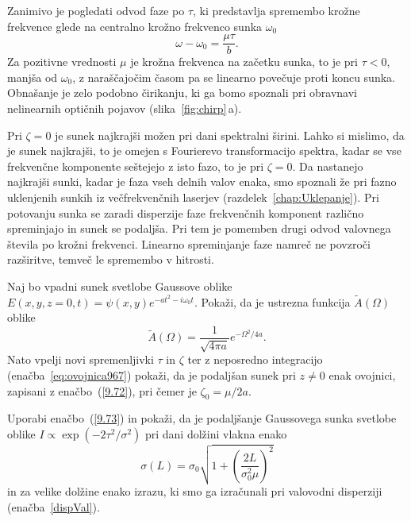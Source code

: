 Zanimivo je pogledati odvod faze po $\tau$, ki predstavlja spremembo krožne
frekvence glede na centralno krožno frekvenco sunka $\omega_{0}$
\begin{equation}
\omega-\omega_{0}=\frac{\mu\tau}{b}.
\label{9.74}
\end{equation}
Za pozitivne vrednosti $\mu$ je krožna frekvenca na začetku sunka,
to je pri $\tau<0$, manjša od $\omega_0$, z naraščajočim časom pa se 
linearno povečuje proti koncu sunka. Obnašanje je zelo podobno čirikanju, 
ki ga bomo spoznali pri obravnavi nelinearnih optičnih pojavov (slika~\ref{fig:chirp}\,a). 
\begin{remark}
Pri $\zeta=0$ je sunek najkrajši možen pri dani spektralni
širini. Lahko si mislimo, da je sunek najkrajši,
to je omejen s Fourierevo transformacijo spektra, kadar se
vse frekvenčne komponente seštejejo z isto fazo, to je pri $\zeta=0$.
Da nastanejo najkrajši sunki, kadar je faza vseh delnih valov enaka,
smo spoznali že pri fazno uklenjenih sunkih iz večfrekvenčnih laserjev
(razdelek~\ref{chap:Uklepanje}).
Pri potovanju sunka se zaradi disperzije faze frekvenčnih komponent
različno spreminjajo in sunek se podaljša. Pri tem je pomemben  
drugi odvod valovnega števila po krožni frekvenci. Linearno spreminjanje faze 
namreč ne povzroči razširitve, temveč le spremembo v hitrosti.
\end{remark}

\begin{definition}
\label{naloga:pulzdisperzija}
Naj bo vpadni sunek svetlobe Gaussove oblike $E(x,y, z=0, t) = 
\psi(x,y) e^{-at^2-i \omega_0 t}$. Pokaži, da je ustrezna funkcija
$\tilde{A}(\Omega)$ oblike
\begin{equation}
\tilde{A}(\Omega) = \frac{1}{\sqrt{4 \pi a}}e^{-\Omega^2/4a}.
\end{equation}
Nato vpelji novi spremenljivki $\tau$ in $\zeta$ ter z neposredno 
integracijo (enačba~\ref{eq:ovojnica967}) pokaži, 
da je podaljšan sunek pri $z\neq 0$ enak ovojnici, 
zapisani z enačbo~(\ref{9.72}), pri čemer je $\zeta_0 = \mu/2 a$.
\end{definition}

\begin{definition}
Uporabi enačbo~(\ref{9.73}) in pokaži, da je podaljšanje Gaussovega 
sunka svetlobe oblike $I \propto \exp(-2\tau^2/\sigma^2)$
pri dani dolžini vlakna enako
\begin{equation}
\sigma (L) = \sigma_0\sqrt{1 + \left(\frac{2 L }{\sigma_0^2 \mu}\right)^2}
\end{equation}
in za velike dolžine enako izrazu, ki smo ga izračunali pri 
valovodni disperziji (enačba~\ref{dispVal}).
\end{definition}

